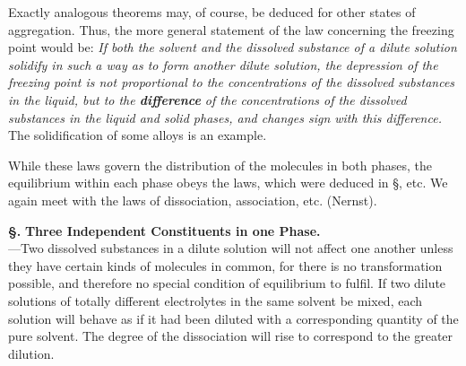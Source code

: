 \documentclass[12pt]{book}[2005/09/16]
\newcommand{\Section}[1]{
  \medskip\par\textbf{§\;#1}
  \label{section:#1}
}
\newcommand{\SecRef}[2][§\;]{\hyperref[section:#2.]{{\upshape #1#2}}}
\newcommand{\PageSep}[1]{\ignorespaces}
\newcommand{\Topic}[1]{\textbf{#1}}
\newcommand{\Emph}[1]{\emph{\textbf{#1}}}
\begin{document}
Exactly analogous theorems may, of course, be deduced
for other states of aggregation. Thus, the more general
statement of the law concerning the freezing point would
be: \emph{If both the solvent and the dissolved substance of a dilute
solution solidify in such a way as to form another dilute
solution, the depression of the freezing point is not proportional
to the concentrations of the dissolved substances in the liquid,
but to the \Emph{difference} of the concentrations of the dissolved
substances in the liquid and solid phases, and changes sign
with this difference.} The solidification of some alloys is an
example.

While these laws govern the distribution of the molecules
in both phases, the equilibrium within each phase
\PageSep{256}
obeys the laws, which were deduced in \SecRef{262}, etc. We
again meet with the laws of dissociation, association, etc.
(Nernst).

\Section{275.} \Topic{Three Independent Constituents in one Phase.} \\
---Two dissolved substances in a dilute solution will not affect
one another unless they have certain kinds of molecules in
common, for there is no transformation possible, and therefore
no special condition of equilibrium to fulfil. If two
dilute solutions of totally different electrolytes in the same
solvent be mixed, each solution will behave as if it had been
diluted with a corresponding quantity of the pure solvent.
The degree of the dissociation will rise to correspond to the
greater dilution.
\end{document}
